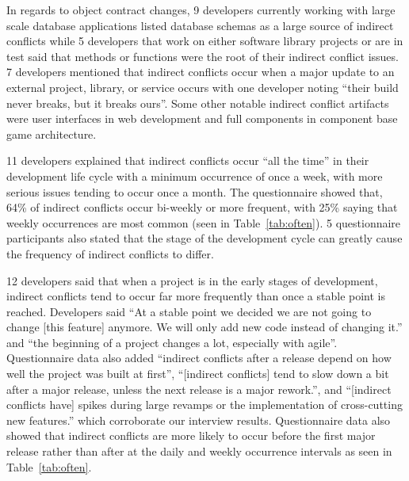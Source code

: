 \documentclass[conference]{IEEEtran}
\begin{document}
In regards to object contract changes, 9 developers currently working with large scale database applications listed database
schemas as a large source of indirect conflicts while 5 developers that work on either software
library projects or are in test said that methods or functions were the root of their indirect conflict issues.
7 developers mentioned that indirect conflicts occur when a major update to an external project,
library, or service occurs with one developer noting ``their build never breaks, but it breaks ours''. Some
other notable indirect conflict artifacts were user interfaces in web development and full components in component
base game architecture.

11 developers explained that indirect conflicts occur ``all the time'' in
their development life cycle with a minimum occurrence of once a week, with more serious issues tending
to occur once a month. The questionnaire showed that, 64\% of indirect conflicts occur bi-weekly
or more frequent,
with 25\% saying that weekly occurrences are most common (seen in Table~\ref{tab:often}). 5 questionnaire participants
also stated that the stage of the development cycle can greatly cause the frequency of indirect conflicts to
differ.

12 developers said that
when a project is in the early stages of development, indirect conflicts tend to occur far more frequently
than once a stable point is reached. Developers said ``At a stable point we decided we are not going to change
[this feature] anymore. We will only add new code instead of changing it.'' and ``the beginning of a project
changes a lot, especially with agile''. Questionnaire data also added ``indirect conflicts after a release
depend on how well the project was built at first'', ``[indirect conflicts] tend to slow down a bit after a
major release, unless the next release is a major rework.'', and ``[indirect conflicts have] spikes during
large revamps or the implementation of cross-cutting new features.'' which corroborate our interview results.
Questionnaire data also showed that
indirect conflicts are more likely to occur before the first major release rather than after at the daily
and weekly occurrence intervals as seen in Table~\ref{tab:often}.
\end{document}
